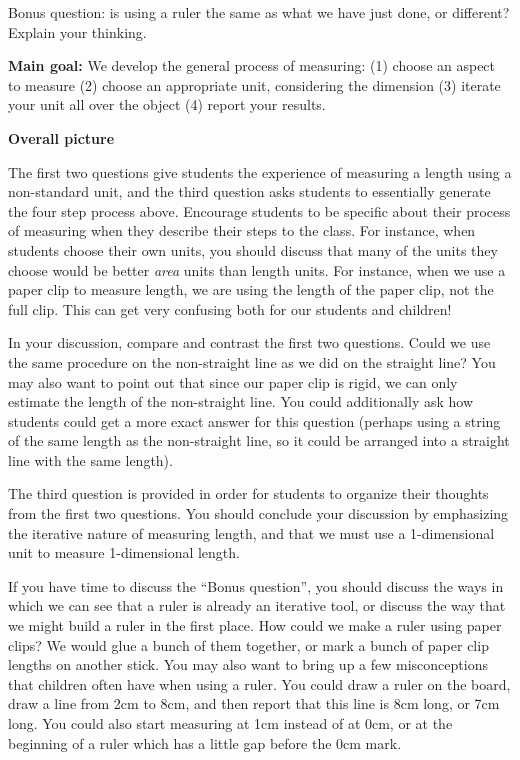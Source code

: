 \documentclass[nooutcomes,noauthor, handout]{ximera}
\begin{document}
\begin{problem}
Bonus question: is using a ruler the same as what we have just done, or different? Explain your thinking.
\end{problem}
\pagebreak
\begin{instructorNotes}

{\bf Main goal:} We develop the general process of measuring: (1) choose an aspect to measure (2) choose an appropriate unit, considering the dimension (3) iterate your unit all over the object (4) report your results.


{\bf Overall picture}

The first two questions give students the experience of measuring a length using a non-standard unit, and the third question asks students to essentially generate the four step process above. Encourage students to be specific about their process of measuring when they describe their steps to the class. For instance, when students choose their own units, you should discuss that many of the units they choose would be better {\em area} units than length units. For instance, when we use a paper clip to measure length, we are using the length of the paper clip, not the full clip.  This can get very confusing both for our students and children!

In your discussion, compare and contrast the first two questions. Could we use the same procedure on the non-straight line as we did on the straight line? You may also want to point out that since our paper clip is rigid, we can only estimate the length of the non-straight line. You could additionally ask how students could get a more exact answer for this question (perhaps using a string of the same length as the non-straight line, so it could be arranged into a straight line with the same length).


The third question is provided in order for students to organize their thoughts from the first two questions.  You should conclude your discussion by emphasizing the iterative nature of measuring length, and that we must use a 1-dimensional unit to measure 1-dimensional length.  


If you have time to discuss the ``Bonus question'', you should discuss the ways in which we can see that a ruler is already an iterative tool, or discuss the way that we might build a ruler in the first place. How could we make a ruler using paper clips? We would glue a bunch of them together, or mark a bunch of paper clip lengths on another stick. You may also want to bring up a few misconceptions that children often have when using a ruler.   You could draw a ruler on the board, draw a line from 2cm to 8cm, and then report that this line is 8cm long, or 7cm long. You could also start measuring at 1cm instead of at 0cm, or at the beginning of a ruler which has a little gap before the 0cm mark.




\end{instructorNotes}
\end{document}
